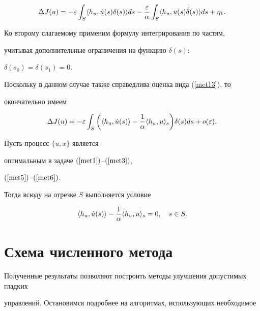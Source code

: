 $$


\Delta J(u)=-\varepsilon \int_S\la h_u,\Dot{u}(s)


\delta(s)\ra ds -\frac{\varepsilon}{\alpha}


\int_S\la h_u,u(s)\Dot{\delta}(s)\ra ds+\eta_1.


$$


Ко второму слагаемому применим формулу интегрирования по частям, 


учитывая дополнительные ограничения на функцию $\delta(s)$:


$\delta(s_0)=\delta(s_1)=0.$





Поскольку в данном случае также справедлива оценка вида (\ref{met13}), то


окончательно имеем


$$


\Delta J(u)=-\varepsilon\int_S


\bigg(\la h_u,\Dot{u}(s)\ra-\frac{1}{\alpha}\la h_u,u\ra_s\bigg)\delta(s)


ds+o(\varepsilon).


$$





\begin{thm}


Пусть процесс $\{u,x\}$ является 


оптимальным в задаче $(\ref{met1})$--$(\ref{met3})$,


$(\ref{met5})$--$(\ref{met6})$. 


Тогда всюду на отрезке $S$ выполняется условие


$$


\la h_u, \Dot{u} (s)\ra-\frac{1}{\alpha}\la h_u,u\ra_s=0,\quad s\in S.


$$


\end{thm}





\section{Схема численного метода}





Полученные результаты позволяют построить методы улучшения допустимых гладких


управлений. Остановимся подробнее на алгоритмах, использующих необходимое


